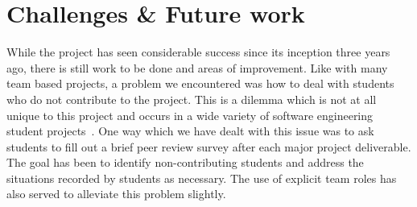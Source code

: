 \documentclass[conference]{IEEEtran}
\newcommand{\todo}[1]{\textcolor{cyan}{\textbf{[#1]}}}
\begin{document}








\section{Challenges \& Future work}
\label{sec: futurework}
While the project has seen considerable success since its inception three years ago, there is still work to be done and areas of improvement. Like with many team based projects, a problem we encountered was how to deal with students who do not contribute to the project. This is a dilemma which is not at all unique to this project and occurs in a wide variety of software engineering student projects~\cite{VanderDuim:2007:GPE:1248820.1248900}. One way which we have dealt with this issue was to ask students to fill out a brief peer review survey after each major project deliverable. The goal has been to identify non-contributing students and address the situations recorded by students as necessary. The use of explicit team roles has also served to alleviate this problem slightly.
\end{document}
